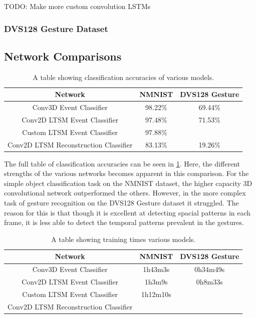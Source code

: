 \color{red} TODO: Make more custom convolution LSTMs \color{black}

\subsubsection{DVS128 Gesture Dataset}

\subsection{Network Comparisons}

\begin{table}[htb]
    \centering
    \begin{tabular}{|| c | c | c ||}
        \hline
        Network     & NMNIST & DVS128 Gesture \\
        \hline \hline
        Conv3D Event Classifier          & 98.22\%   &   69.44\%    \\
        \hline
        Conv2D LTSM Event Classifier         & 97.48\%   &    71.53\%    \\
        \hline
        Custom LTSM Event Classifier         & 97.88\%  &        \\
        \hline
        Conv2D LTSM Reconstruction Classifier           & \color{red} 83.13\% \color{black}    &    \color{red} 19.26\% \color{black}   \\
        \hline
    \end{tabular}
    \caption{A table showing classification accuracies of various models.}
    \label{tab:network_performances}
\end{table}

The full table of classification accuracies can be seen in \cref{tab:network_performances}. Here, the different strengths of the various networks becomes apparent in this comparison. For the simple object classification task on the NMNIST dataset, the higher capacity 3D convolutional network outperformed the others. However, in the more complex task of gesture recognition on the DVS128 Gesture dataset it struggled. The reason for this is that though it is excellent at detecting spacial patterns in each frame, it is less able to detect the temporal patterns prevalent in the gestures.

\begin{table}[htb]
    \centering
    \begin{tabular}{|| c | c | c ||}
        \hline
        Network     & NMNIST & DVS128 Gesture \\
        \hline \hline
        Conv3D Event Classifier          & 1h43m3s   &   0h34m49s    \\
        \hline
        Conv2D LTSM Event Classifier         & 1h3m9s   &    0h8m33s    \\
        \hline
        Custom LTSM Event Classifier         &  1h12m10s  &    \color{red} \color{black}    \\
        \hline
        Conv2D LTSM Reconstruction Classifier           &     &      \\
        \hline
    \end{tabular}
    \caption{A table showing training times various models.}
    \label{tab:network_training_times}
\end{table}

